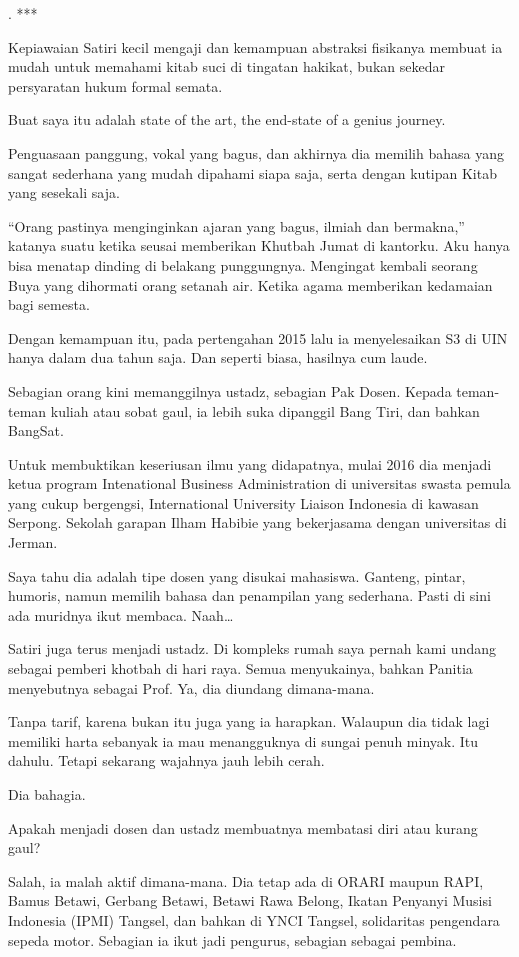 .
***

Kepiawaian Satiri kecil mengaji dan kemampuan abstraksi fisikanya membuat ia mudah untuk memahami kitab suci di tingatan hakikat, bukan sekedar persyaratan hukum formal semata.

Buat saya itu adalah state of the art, the end-state of a genius journey.

Penguasaan panggung, vokal yang bagus, dan akhirnya dia memilih bahasa yang sangat sederhana yang mudah dipahami siapa saja, serta dengan kutipan Kitab yang sesekali saja.

“Orang pastinya menginginkan ajaran yang bagus, ilmiah dan bermakna,” katanya suatu ketika seusai memberikan Khutbah Jumat di kantorku. Aku hanya bisa menatap dinding di belakang punggungnya. Mengingat kembali seorang Buya yang dihormati orang setanah air. Ketika agama memberikan kedamaian bagi semesta.

Dengan kemampuan itu, pada pertengahan 2015 lalu ia menyelesaikan S3 di UIN hanya dalam dua tahun saja. Dan seperti biasa, hasilnya cum laude.

Sebagian orang kini memanggilnya ustadz, sebagian Pak Dosen. Kepada teman-teman kuliah atau sobat gaul, ia lebih suka dipanggil Bang Tiri, dan bahkan BangSat.

Untuk membuktikan keseriusan ilmu yang didapatnya, mulai 2016 dia menjadi ketua program Intenational Business Administration di universitas swasta pemula yang cukup bergengsi, International University Liaison Indonesia di kawasan Serpong. Sekolah garapan Ilham Habibie yang bekerjasama dengan universitas di Jerman.

Saya tahu dia adalah tipe dosen yang disukai mahasiswa. Ganteng, pintar, humoris, namun memilih bahasa dan penampilan yang sederhana. Pasti di sini ada muridnya ikut membaca. Naah…

Satiri juga terus menjadi ustadz. Di kompleks rumah saya pernah kami undang sebagai pemberi khotbah di hari raya. Semua menyukainya, bahkan Panitia menyebutnya sebagai Prof. Ya, dia diundang dimana-mana.

Tanpa tarif, karena bukan itu juga yang ia harapkan. Walaupun dia tidak lagi memiliki harta sebanyak ia mau menangguknya di sungai penuh minyak. Itu dahulu. Tetapi sekarang wajahnya jauh lebih cerah.

Dia bahagia.

Apakah menjadi dosen dan ustadz membuatnya membatasi diri atau kurang gaul?

Salah, ia malah aktif dimana-mana. Dia tetap ada di ORARI maupun RAPI, Bamus Betawi, Gerbang Betawi, Betawi Rawa Belong, Ikatan Penyanyi Musisi Indonesia (IPMI) Tangsel, dan bahkan di YNCI Tangsel, solidaritas pengendara sepeda motor. Sebagian ia ikut jadi pengurus, sebagian sebagai pembina.

